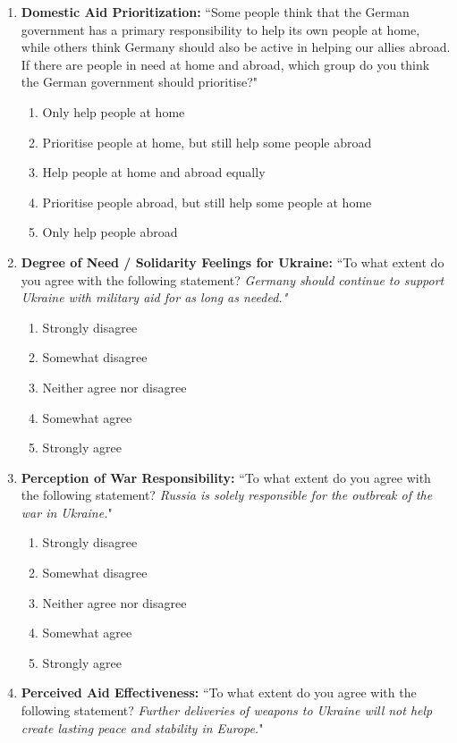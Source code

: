 \begin{appendices}
\begin{enumerate}
    \item \textbf{Domestic Aid Prioritization:}  ``Some people think that the German government has a primary responsibility to help its own people at home, while others think Germany should also be active in helping our allies abroad. If there are people in need at home and abroad, which group do you think the German government should prioritise?" 
    \begin{enumerate}
        \item Only help people at home
        \item Prioritise people at home, but still help some people abroad
        \item Help people at home and abroad equally
        \item Prioritise people abroad, but still help some people at home 
        \item Only help people abroad 
    \end{enumerate}
    \item \textbf{\textbf{Degree of Need / Solidarity Feelings for Ukraine:}} ``To what extent do you agree with the following statement? \textit{Germany should continue to support Ukraine with military aid for as long as needed."}
    \begin{enumerate}
        \item Strongly disagree
        \item Somewhat disagree
        \item Neither agree nor disagree
        \item Somewhat agree
        \item Strongly agree
    \end{enumerate}
    \item \textbf{Perception of War Responsibility:} ``To what extent do you agree with the following statement? \textit{Russia is solely responsible for the outbreak of the war in Ukraine.}"
    \begin{enumerate}
        \item Strongly disagree
        \item Somewhat disagree
        \item Neither agree nor disagree
        \item Somewhat agree
        \item Strongly agree
    \end{enumerate}
    \item \textbf{Perceived Aid Effectiveness:} ``To what extent do you agree with the following statement? \textit{Further deliveries of weapons to Ukraine will not help create lasting peace and stability in Europe.}"

\end{enumerate}
\end{appendices}
